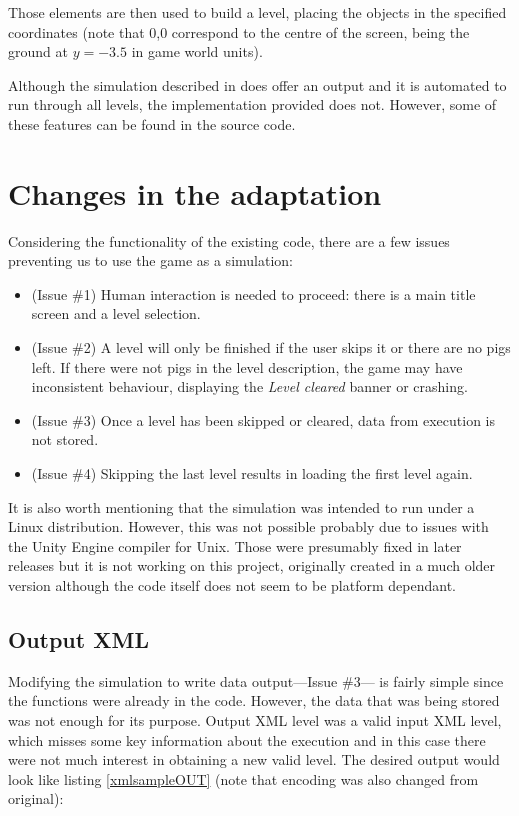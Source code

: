 Those elements are then used to build a level, placing the objects in the specified coordinates (note that 0,0 correspond to the centre of the screen, being the ground at $y=-3.5$ in game world units).

Although the simulation described in \cite{ferreira2014search} does offer an output and it is automated to run through all levels, the implementation provided does not. However, some of these features can be found in the source code.

\section{Changes in the adaptation}
Considering the functionality of the existing code, there are a few issues preventing us to use the game as a simulation:

\begin{itemize}
	\item (Issue \#1) Human interaction is needed to proceed: there is a main title screen and a level selection.
	\item (Issue \#2) A level will only be finished if the user skips it or there are no pigs left. If there were not pigs in the level description, the game may have inconsistent behaviour, displaying the \textit{Level cleared} banner or crashing.
	\item (Issue \#3) Once a level has been skipped or cleared, data from execution is not stored.
	\item (Issue \#4) Skipping the last level results in loading the first level again. 
\end{itemize}

It is also worth mentioning that the simulation was intended to run under a Linux distribution. However, this was not possible probably due to issues with the Unity Engine compiler for Unix. Those were presumably fixed in later releases but it is not working on this project, originally created in a much older version although the code itself does not seem to be platform dependant.


\subsection{Output XML}

Modifying the simulation to write data output---Issue \#3--- is fairly simple since the functions were already in the code. However, the data that was being stored was not enough for its purpose. Output XML level was a valid input XML level, which misses some key information about the execution and in this case there were not much interest in obtaining a new valid level. The desired output would look like listing \ref{xmlsampleOUT} (note that encoding was also changed from original):

